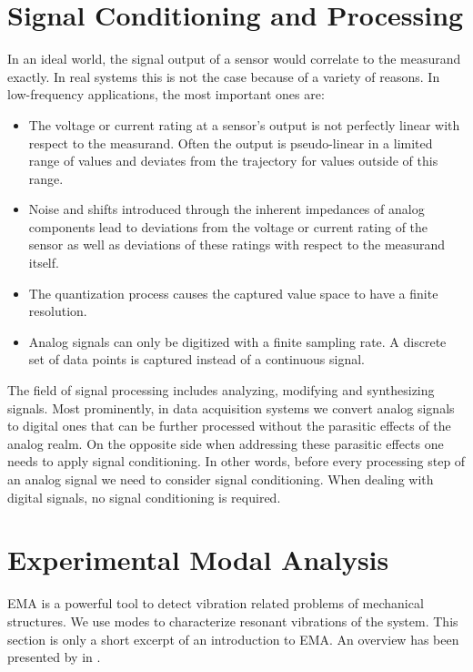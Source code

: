 \section{Signal Conditioning and Processing}
In an ideal world, the signal output of a sensor would correlate to the measurand exactly. In real systems this is not the case because of a variety of reasons. In low-frequency applications, the most important ones are:

\begin{itemize}
    \item The voltage or current rating at a sensor's output is not perfectly linear with respect to the measurand. Often the output is pseudo-linear in a limited range of values and deviates from the trajectory for values outside of this range.
    \item Noise and shifts introduced through the inherent impedances of analog components lead to deviations from the voltage or current rating of the sensor as well as deviations of these ratings with respect to the measurand itself.
    \item The quantization process causes the captured value space to have a finite resolution.
    \item Analog signals can only be digitized with a finite sampling rate. A discrete set of data points is captured instead of a continuous signal.
\end{itemize}

The field of signal processing includes analyzing, modifying and synthesizing signals. Most prominently, in data acquisition systems we convert analog signals to digital ones that can be further processed without the parasitic effects of the analog realm. On the opposite side when addressing these parasitic effects one needs to apply signal conditioning. In other words, before every processing step of an analog signal we need to consider signal conditioning. When dealing with digital signals, no signal conditioning is required.

\section{Experimental Modal Analysis}

\ac{EMA} is a powerful tool to detect vibration related problems of mechanical structures. We use modes to characterize resonant vibrations of the system. This section is only a short excerpt of an introduction to \ac{EMA}. An overview has been presented by \citeauthor{schwarz1999experimental} in \cite{schwarz1999experimental}.

